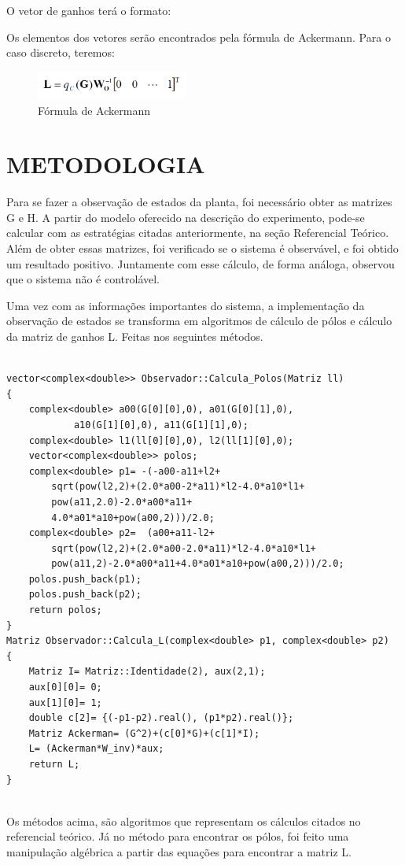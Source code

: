\documentclass[a4paper,12pt]{article}
\begin{document}
O vetor de ganhos terá o formato:

\hspace{4ex}{\bf L=[L1,L2,…,Ln]}

Os elementos dos vetores serão encontrados pela fórmula de Ackermann. Para o caso discreto, teremos:

\begin{figure}[!h]
\centering
\includegraphics[width=5cm]{fotosLab5/ackermann.png}
\caption{Fórmula de Ackermann}
\label{ackermann}
\end{figure}


\newpage



\section{METODOLOGIA}

\hspace{4ex}Para se fazer a observação de estados da planta, foi necessário obter as matrizes G e H. A partir do modelo oferecido na descrição do experimento, pode-se calcular com as estratégias citadas anteriormente, na seção Referencial Teórico. Além de obter essas matrizes, foi verificado se o sistema é observável, e foi obtido um resultado positivo. Juntamente com esse cálculo, de forma análoga, observou que o sistema não é controlável.

\hspace{4ex}Uma vez com as informações importantes do sistema, a implementação da observação de estados se transforma em algoritmos de cálculo de pólos e cálculo da matriz de ganhos L. Feitas nos seguintes métodos.

\begin{lstlisting}

vector<complex<double>> Observador::Calcula_Polos(Matriz ll)
{
    complex<double> a00(G[0][0],0), a01(G[0][1],0), 
    		a10(G[1][0],0), a11(G[1][1],0);
    complex<double> l1(ll[0][0],0), l2(ll[1][0],0);
    vector<complex<double>> polos;
    complex<double> p1= -(-a00-a11+l2+
    	sqrt(pow(l2,2)+(2.0*a00-2*a11)*l2-4.0*a10*l1+
    	pow(a11,2.0)-2.0*a00*a11+
    	4.0*a01*a10+pow(a00,2)))/2.0;
    complex<double> p2=  (a00+a11-l2+
    	sqrt(pow(l2,2)+(2.0*a00-2.0*a11)*l2-4.0*a10*l1+
    	pow(a11,2)-2.0*a00*a11+4.0*a01*a10+pow(a00,2)))/2.0;
    polos.push_back(p1);
    polos.push_back(p2);
    return polos;
}
Matriz Observador::Calcula_L(complex<double> p1, complex<double> p2)
{
    Matriz I= Matriz::Identidade(2), aux(2,1);
    aux[0][0]= 0;
    aux[1][0]= 1;
    double c[2]= {(-p1-p2).real(), (p1*p2).real()};
    Matriz Ackerman= (G^2)+(c[0]*G)+(c[1]*I);
    L= (Ackerman*W_inv)*aux;
    return L;
}


\end{lstlisting}
\hspace{4ex}Os métodos acima, são algoritmos que representam os cálculos citados no referencial teórico. Já no método para encontrar os pólos, foi feito uma manipulação algébrica a partir das equações para encontrar a matriz L.
\end{document}
